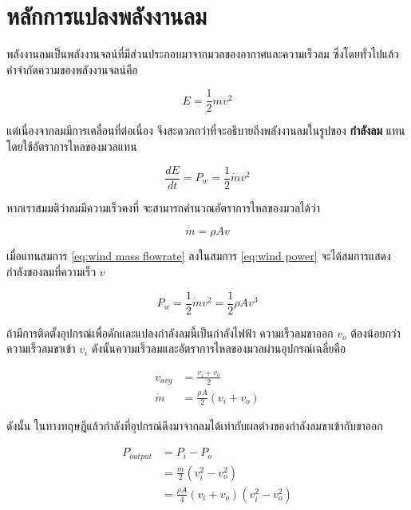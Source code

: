 \documentclass[a4paper,nobib,openany,10pt]{tufte-book}
\begin{document}
\section{หลักการแปลงพลังงานลม}
\label{sec:org6482f9d}
พลังงานลมเป็นพลังงานจลน์ที่มีส่วนประกอบมาจากมวลของอากาศและความเร็วลม
ซึ่งโดยทั่วไปแล้ว คำจำกัดความของพลังงานจลน์คือ

\[E = \frac{1}{2} mv^2\]

แต่เนื่องจากลมมีการเคลื่อนที่ต่อเนื่อง
จึงสะดวกกว่าที่จะอธิบายถึงพลังงานลมในรูปของ \textbf{กำลังลม} แทนโดยใช้อัตราการไหลของมวลแทน

\begin{equation}
\label{eq:wind power}
  \frac{dE}{dt} = P_w = \frac{1}{2} \dot{m} v^2
\end{equation}

หากเราสมมติว่าลมมีความเร็วคงที่ จะสามารถคำนวณอัตราการไหลของมวลได้ว่า

\begin{equation}
\label{eq:wind mass flowrate}
  \dot{m} = \rho A v
\end{equation}

เมื่อแทนสมการ \ref{eq:wind mass flowrate} ลงในสมการ \ref{eq:wind power} จะได้สมการแสดงกำลังของลมที่ความเร็ว \(v\)

\begin{equation}
\label{eq:wind power v}
  P_w = \frac{1}{2} \dot{m} v^2 = \frac{1}{2} \rho A v^3
\end{equation}

ถ้ามีการติดตั้งอุปกรณ์เพื่อดักและแปลงกำลังลมนี้เป็นกำลังไฟฟ้า
ความเร็วลมขาออก \(v_o\) ต้องน้อยกว่าความเร็วลมขาเข้า \(v_i\)
ดังนั้นความเร็วลมและอัตราการไหลของมวลผ่านอุปกรณ์เฉลี่ยคือ

\begin{align}
\label{eq:average wind speed through turbine}
  v_{avg} &= \frac{v_i + v_o}{2} \\
  \dot{m} &= \frac{\rho A}{2} \left( v_i + v_o \right)
\end{align}

ดังนั้น
ในทางทฤษฎีแล้วกำลังที่อุปกรณ์ดึงมาจากลมได้เท่ากับผลต่างของกำลังลมขาเข้ากับขาออก

\begin{align}
  P_{output} &= P_{i} - P_{o} \nonumber \\
             &= \frac{\dot{m}}{2} \left( v_i^2 - v_o^2 \right) \nonumber \\
             &= \frac{\rho A}{4} \left( v_i + v_o \right)\left( v_i^2 - v_o^2 \right)
\end{align}
\end{document}
